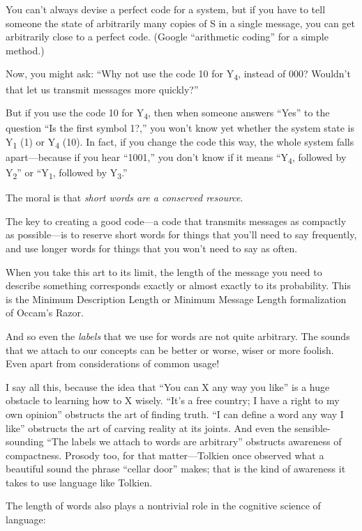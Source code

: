 {
 You can't always devise a perfect code for a
system, but if you have to tell someone the state of arbitrarily many
copies of S in a single message, you can get arbitrarily close to a
perfect code. (Google ``arithmetic
coding'' for a simple method.)}

{
 Now, you might ask: ``Why not use the code 10 for
Y\textsubscript{4}, instead of 000? Wouldn't that let
us transmit messages more quickly?''}

{
 But if you use the code 10 for Y\textsubscript{4}, then when
someone answers ``Yes'' to the
question ``Is the first symbol 1?,''
you won't know yet whether the system state is
Y\textsubscript{1} (1) or Y\textsubscript{4} (10). In fact, if you
change the code this way, the whole system falls apart---because if you
hear ``1001,'' you
don't know if it means
``Y\textsubscript{4}, followed by
Y\textsubscript{2}'' or
``Y\textsubscript{1}, followed by
Y\textsubscript{3}.''}

{
 The moral is that \textit{short words are a conserved resource}.}

{
 The key to creating a good code---a code that transmits messages
as compactly as possible---is to reserve short words for things that
you'll need to say frequently, and use longer words for
things that you won't need to say as often.}

{
 When you take this art to its limit, the length of the message you
need to describe something corresponds exactly or almost exactly to its
probability. This is the Minimum Description Length or Minimum Message
Length formalization of Occam's Razor.}

{
 And so even the \textit{labels} that we use for words are not
quite arbitrary. The sounds that we attach to our concepts can be
better or worse, wiser or more foolish. Even apart from considerations
of common usage!}

{
 I say all this, because the idea that ``You can X
any way you like'' is a huge obstacle to learning how
to X wisely. ``It's a free country; I
have a right to my own opinion'' obstructs the art of
finding truth. ``I can define a word any way I
like'' obstructs the art of carving reality at its
joints. And even the sensible-sounding ``The labels we
attach to words are arbitrary'' obstructs awareness
of compactness. Prosody too, for that matter---Tolkien once observed
what a beautiful sound the phrase ``cellar
door'' makes; that is the kind of awareness it takes
to use language like Tolkien.}

{
 The length of words also plays a nontrivial role in the cognitive
science of language:}

